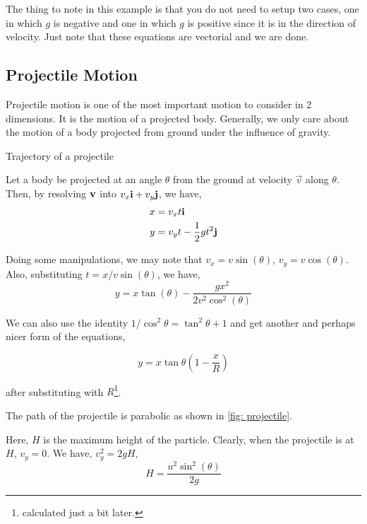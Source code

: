 The thing to note in this example is that you do not need to setup two cases, one in which
\(g\) is negative and one in which \(g\) is positive since it is in the direction of velocity. 
Just note that these equations are vectorial and we are done.


\subsection{Projectile Motion}

Projectile motion is one of the most important motion to consider in 
2 dimensions. It is the motion of a projected body. Generally, we
only care about the motion of a body projected from ground under the influence
of gravity. 

\begin{marginfigure}
    \centering
    \caption{Trajectory of a projectile}
    \label{fig: projectile}
\end{marginfigure}

Let a body be projected at an angle \(\theta\) from the ground at velocity \(\vec{v}\)
along \(\theta\). Then, by resolving \(\boldsymbol{\mathbf{v}}\) into \(v_x \boldsymbol{\mathbf{i}} + v_y\boldsymbol{\mathbf{j}}\),
we have, 
\begin{align*}
    x &= v_xt \boldsymbol{\mathbf{i}} \\
    y &= v_yt - \frac{1}{2}gt^2 \boldsymbol{\mathbf{j}}
\end{align*}

Doing some manipulations, we may note that \(v_x = v\sin(\theta)\), \(v_y = v\cos(\theta)\).
Also, substituting \(t = x/v\sin(\theta)\), we have,
\begin{equation}
    \boxed{y = x\tan(\theta) - \frac{gx^2}{2v^2\cos^2(\theta)}}
\end{equation}

We can also use the identity \(1/\cos^2\theta = \tan^2\theta + 1\) and get another and 
perhaps nicer form of the equations,

\begin{equation}
    \boxed{y = x\tan\theta\left(1 - \frac{x}{R}\right)}
\end{equation}

after substituting with \(R\)\footnote{calculated just a bit later.}.

The path of the projectile is parabolic as shown in \cref{fig: projectile}.

Here, \(H\) is the maximum height of the particle. Clearly,
when the projectile is at \(H\), \(v_y = 0\). We have, 
\(v_y^2 = 2gH\),
\begin{equation}
    H = \frac{u^2\sin^2(\theta)}{2g}
\end{equation}

